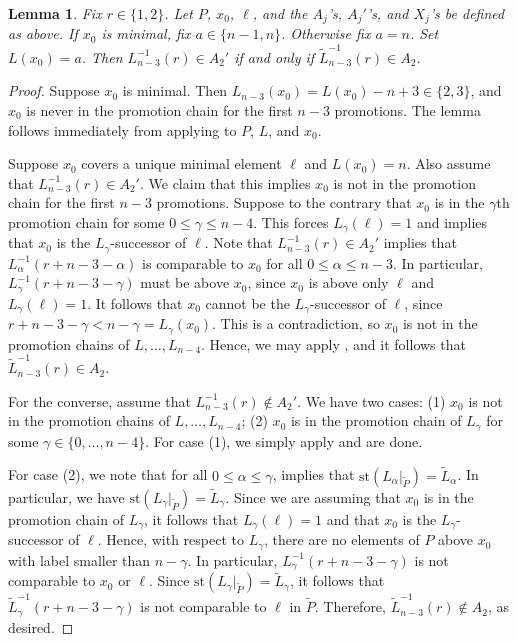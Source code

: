 \documentclass[11pt]{amsart}
\newtheorem{lemma}[thm]{Lemma}
\theoremstyle{definition}
\newcommand{\inverse}{^{-1}}
\newcommand{\st}{\mathrm{st}}
\begin{document}
\begin{lemma}\label{A2}
	Fix $ r\in\{1,2\} $. Let $ P $, $ x_0 $, $ \ell $, and the $ A_j $'s, $ A_j' $'s, and $ X_j $'s be defined as above. If $ x_0 $ is minimal, fix $ a\in\{n-1,n\} $. Otherwise fix $ a=n $. Set $ L(x_0)=a $. Then $ L_{n-3}\inverse(r)\in A_2' $ if and only if $ \tilde{L}_{n-3}\inverse(r)\in A_2 $.
\end{lemma}
\begin{proof}
	Suppose $ x_0 $ is minimal. Then $ L_{n-3}(x_0)=L(x_0)-n+3\in\{2,3\} $, and $ x_0 $ is never in the promotion chain for the first $ n-3 $ promotions. The lemma follows immediately from applying  to $ P $, $ L $, and $ x_0 $.
	
	Suppose $ x_0 $ covers a unique minimal element $ \ell $ and $ L(x_0)=n $. Also assume that $ L_{n-3}\inverse(r)\in A_2' $. We claim that this implies $ x_0 $ is not in the promotion chain for the first $ n-3 $ promotions. Suppose to the contrary that $ x_0 $ is in the $ \gamma $th promotion chain for some $ 0\leq\gamma\leq n-4 $. This forces $ L_\gamma(\ell)=1 $ and implies that $ x_0 $ is the $ L_\gamma $-successor of $ \ell $. Note that $ L_{n-3}\inverse(r)\in A_2' $ implies that $ L_{\alpha}\inverse(r+n-3-\alpha) $ is comparable to $ x_0 $ for all $ 0\leq\alpha\leq n-3 $. In particular, $ L_{\gamma}\inverse(r+n-3-\gamma) $ must be above $ x_0 $, since $ x_0 $ is above only $ \ell $ and $ L_{\gamma}(\ell)=1 $. It follows that $ x_0 $ cannot be the $ L_{\gamma} $-successor of $ \ell $, since $ r+n-3-\gamma<n-\gamma=L_{\gamma}(x_0) $. This is a contradiction, so $ x_0 $ is not in the promotion chains of $ L,\ldots,L_{n-4} $. Hence, we may apply , and it follows that $ \tilde{L}_{n-3}\inverse(r)\in A_2 $. 
	
	For the converse, assume that $ L_{n-3}\inverse(r)\not\in A_2' $. We have two cases: (1) $ x_0 $ is not in the promotion chains of $ L,\ldots,L_{n-4} $; (2) $ x_0 $ is in the promotion chain of $ L_{\gamma} $ for some $ \gamma\in\{0,\ldots,n-4\} $. For case (1), we simply apply  and are done. 
	
	For case (2), we note that for all $ 0\leq\alpha\leq\gamma $,  implies that $ \st(L_{\alpha}|_{\tilde{P}})=\tilde{L}_{\alpha} $. In particular, we have $ \st(L_{\gamma}|_{\tilde{P}})=\tilde{L}_{\gamma} $. Since we are assuming that $ x_0 $ is in the promotion chain of $ L_{\gamma} $, it follows that $ L_{\gamma}(\ell)=1 $ and that $ x_0 $ is the $ L_{\gamma} $-successor of $ \ell $. Hence, with respect to $ L_{\gamma} $, there are no elements of $ P $ above $ x_0 $ with label smaller than $ n-\gamma $. In particular, $ L_{\gamma}\inverse(r+n-3-\gamma) $ is not comparable to $ x_0 $ or $ \ell $. Since $ \st(L_{\gamma}|_{\tilde{P}})=\tilde{L}_{\gamma} $, it follows that $ \tilde{L}_{\gamma}\inverse(r+n-3-\gamma) $ is not comparable to $ \ell $ in $ \tilde{P} $. Therefore, $ \tilde{L}_{n-3}\inverse(r)\not\in A_2 $, as desired. 
\end{proof}
\end{document}
